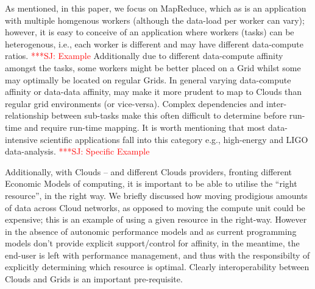 \documentclass[conference,final]{IEEEtran}
\newcommand{\jhanote}[1]{ {\textcolor{red} { ***SJ: #1 }}}
\newcommand{\jhanote}[1]{}
\begin{document}
As mentioned, in this paper, we focus on MapReduce, which as is an
application with multiple homgenous workers (although the data-load
per worker can vary); however, it is easy to conceive of an
application where workers (tasks) can be heterogenous, i.e., each
worker is different and may have different data-compute ratios.
\jhanote{Example} Additionally due to different data-compute affinity
amongst the tasks, some workers might be better placed on a Grid
whilst some may optimally be located on regular Grids.  In general
varying data-compute affinity or data-data affinity, may make it more
prudent to map to Clouds than regular grid environments (or
vice-versa).  Complex dependencies and inter-relationship between
sub-tasks make this often difficult to determine before run-time and
require run-time mapping. It is worth mentioning that most
data-intensive scientific applications fall into this category e.g.,
high-energy and LIGO data-analysis.  \jhanote{Specific Example}

Additionally, with Clouds -- and different Clouds providers, fronting
different Economic Models of computing, it is important to be able to
utilise the ``right resource'', in the right way. We briefly discussed
how moving prodigious amounts of data across Cloud networks, as
opposed to moving the compute unit could be expensive; this is an
example of using a given resource in the right-way. However in the
absence of autonomic performance models and as current programming
models don't provide explicit support/control for affinity, in the
meantime, the end-user is left with performance management, and thus
with the responsibilty of explicitly determining which resource is
optimal. Clearly interoperability between Clouds and Grids is an
important pre-requisite.

\end{document}
